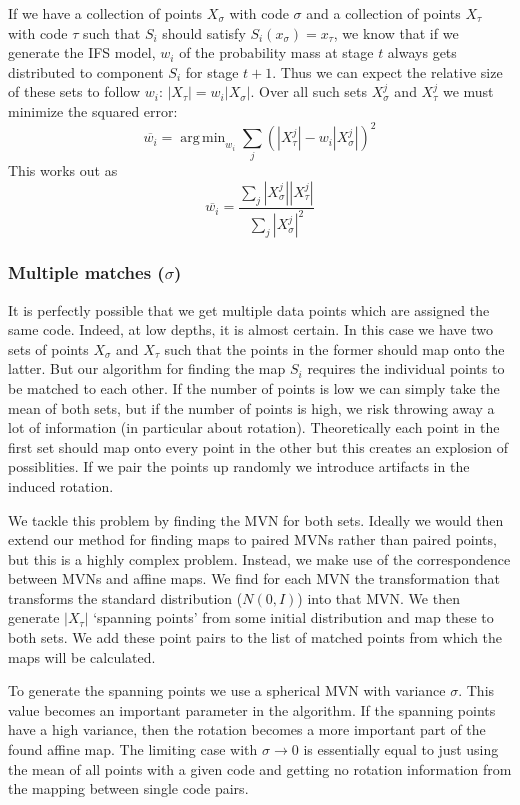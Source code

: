 \documentclass[10pt,a4paper,oneside]{article}
\theoremstyle{definition}
\DeclareMathOperator*{\argmin}{arg\,min}
\begin{document}
If we have a collection of points $X_\sigma$ with code $\sigma$ and a collection of points $X_\tau$ with code $\tau$ such that $S_i$ should satisfy $S_i(x_\sigma) = x_\tau$, we know that if we generate the IFS model, $w_i$ of the probability mass at stage $t$ always gets distributed to component $S_i$ for stage $t + 1$. Thus we can expect the relative size of these sets to follow $w_i$: $|X_\tau| = w_i |X_\sigma|$. Over all such sets $X_\sigma^j$ and $X_\tau^j$ we must minimize the squared error:
\[
\overline{w_i} = \argmin_{w_i} \sum_{j} \left( |X_\tau^j| - w_i |X_\sigma^j| \right)^2
\]
This works out as 
\[
\overline{w_i} = \frac{\sum_{j}|X_\sigma^j||X_\tau^j|}{\sum_{j}|X_\sigma^j|^2}
\]

\subsubsection*{Multiple matches ($\sigma$)}

It is perfectly possible that we get multiple data points which are assigned the same code. Indeed, at low depths, it is almost certain. In this case we have two sets of points $X_\sigma$ and $X_\tau$ such that the points in the former should map onto the latter. But our algorithm for finding the map $S_i$ requires the individual points to be matched to each other. If the number of points is low we can simply take the mean of both sets, but if the number of points is high, we risk throwing away a lot of information (in particular about rotation). Theoretically each point in the first set should map onto every point in the other but this creates an explosion of possiblities. If we pair the points up randomly we introduce artifacts in the induced rotation.

We tackle this problem by finding the MVN for both sets. Ideally we would then extend our method for finding maps to paired MVNs rather than paired points, but this is a highly complex problem. Instead, we make use of the correspondence between MVNs and affine maps. We find for each MVN the transformation that transforms the standard distribution ($N(0, I)$) into that MVN. We then generate $|X_\tau|$ `spanning points' from some initial distribution and map these to both sets. We add these point pairs to the list of matched points from which the maps will be calculated.

To generate the spanning points we use a spherical MVN with variance $\sigma$. This value becomes an important parameter in the algorithm. If the spanning points have a high variance, then the rotation becomes a more important part of the found affine map. The limiting case with $\sigma \rightarrow 0$ is essentially equal to just using the mean of all points with a given code and getting no rotation information from the mapping between single code pairs.
\end{document}

